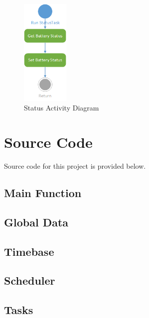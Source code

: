 \documentclass[12pt]{article} %
\begin{document}
    \begin{figure}[H]
      \centering
      \includegraphics[width=0.2\textwidth]{../design/Status_activity.png}
      \caption{Status Activity Diagram}
      \label{fig:statusActivity}
    \end{figure}

    \pagebreak

    \section{Source Code}

    Source code for this project is provided below.

    \subsection{Main Function}
    

    \subsection{Global Data}
    
    

    \subsection{Timebase}
    

    \subsection{Scheduler}
    
    

    \subsection{Tasks}
\end{document}
